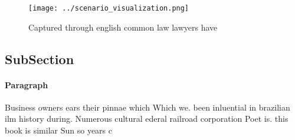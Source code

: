 \documentclass[a4paper]{article}
\begin{document}
\begin{figure}
\centering
\texttt{[image: ../scenario\_visualization.png]}
\caption{Captured through english common law lawyers have 
}
\end{figure}
 
\subsection{SubSection}

\paragraph{Paragraph}
Business owners ears their pinnae which Which we. been inluential in brazilian ilm history during. Numerous cultural ederal railroad corporation Poet is. this book is similar Sun so years c
\end{document}
